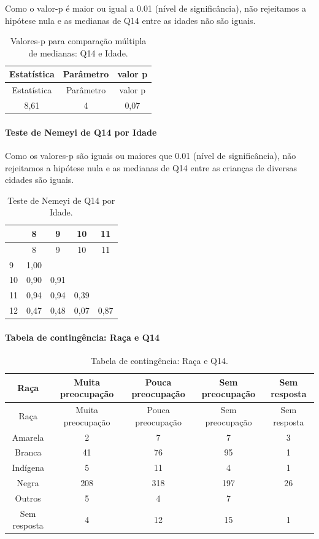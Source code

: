 \documentclass[]{article}
\let\oldparagraph\paragraph
\renewcommand{\paragraph}[1]{\oldparagraph{#1}\mbox{}}
\begin{document}
Como o valor-p é maior ou igual a 0.01 (nível de significância), não rejeitamos a hipótese nula e as medianas de Q14 entre as idades não são iguais.

\begin{longtable}[]{@{}ccc@{}}
\caption{\label{tab:unnamed-chunk-39}Valores-p para comparação múltipla de medianas: Q14 e Idade.}\tabularnewline
\toprule
Estatística & Parâmetro & valor p\tabularnewline
\midrule
\endfirsthead
\toprule
Estatística & Parâmetro & valor p\tabularnewline
\midrule
\endhead
8,61 & 4 & 0,07\tabularnewline
\bottomrule
\end{longtable}

\hypertarget{teste-de-nemeyi-de-q14-por-idade}{%
\paragraph{Teste de Nemeyi de Q14 por Idade}\label{teste-de-nemeyi-de-q14-por-idade}}

Como os valores-p são iguais ou maiores que 0.01 (nível de significância), não rejeitamos a hipótese nula e as medianas de Q14 entre as crianças de diversas cidades são iguais.

\begin{longtable}[]{@{}lcccc@{}}
\caption{\label{tab:unnamed-chunk-41}Teste de Nemeyi de Q14 por Idade.}\tabularnewline
\toprule
& 8 & 9 & 10 & 11\tabularnewline
\midrule
\endfirsthead
\toprule
& 8 & 9 & 10 & 11\tabularnewline
\midrule
\endhead
9 & 1,00 & & &\tabularnewline
10 & 0,90 & 0,91 & &\tabularnewline
11 & 0,94 & 0,94 & 0,39 &\tabularnewline
12 & 0,47 & 0,48 & 0,07 & 0,87\tabularnewline
\bottomrule
\end{longtable}

\cleardoublepage

\hypertarget{tabela-de-continguxeancia-rauxe7a-e-q14}{%
\paragraph{Tabela de contingência: Raça e Q14}\label{tabela-de-continguxeancia-rauxe7a-e-q14}}

\begin{longtable}[]{@{}ccccc@{}}
\caption{\label{tab:unnamed-chunk-42}Tabela de contingência: Raça e Q14.}\tabularnewline
\toprule
Raça & Muita preocupação & Pouca preocupação & Sem preocupação & Sem resposta\tabularnewline
\midrule
\endfirsthead
\toprule
Raça & Muita preocupação & Pouca preocupação & Sem preocupação & Sem resposta\tabularnewline
\midrule
\endhead
Amarela & 2 & 7 & 7 & 3\tabularnewline
Branca & 41 & 76 & 95 & 1\tabularnewline
Indígena & 5 & 11 & 4 & 1\tabularnewline
Negra & 208 & 318 & 197 & 26\tabularnewline
Outros & 5 & 4 & 7 &\tabularnewline
Sem resposta & 4 & 12 & 15 & 1\tabularnewline
\bottomrule
\end{longtable}
\end{document}
